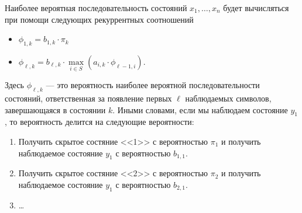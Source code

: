 \documentclass[12pt]{article}
\begin{document}
Наиболее вероятная последовательность состояний $x_1, \ldots, x_n$ будет вычисляться при помощи следующих рекуррентных соотношений
\begin{itemize}
\item $\phi_{1,k} = b_{1,k} \cdot \pi_k$
\item $\phi_{\ell,k} = b_{\ell,k} \cdot \max\limits_{i \in S} (a_{i, k} \cdot \phi_{\ell-1, i})$.
\end{itemize}
Здесь $\phi_{\ell, k}$ — это вероятность наиболее вероятной последовательности состояний, ответственная за появление первых $\ell$ наблюдаемых символов, завершающаяся в состоянии $k$.
Иными словами, если мы наблюдаем состояние $y_1$, то вероятность делится на следующие вероятности:
\begin{enumerate}
\item Получить скрытое состяние <<1>> с вероятностью $\pi_1$ и получить наблюдаемое состояние $y_1$ с вероятностью $b_{1,1}$.
\item Получить скрытое состяние <<2>> с вероятностью $\pi_2$ и получить наблюдаемое состояние $y_1$ с вероятностью $b_{2,1}$.
\item \ldots
\end{enumerate}
\end{document}
